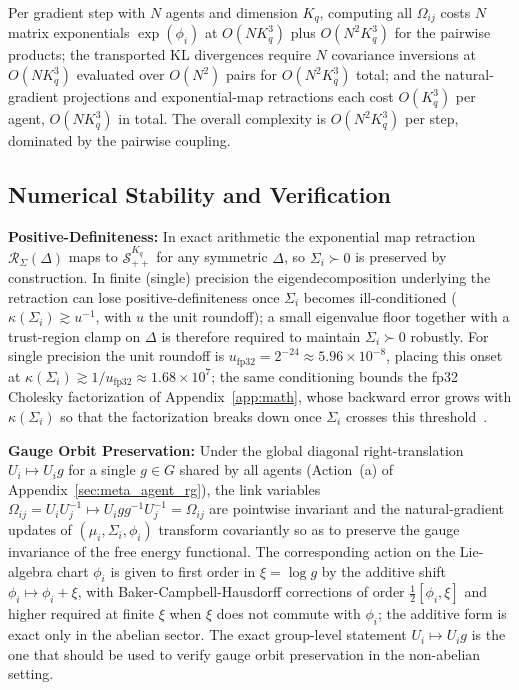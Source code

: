 \documentclass[11pt]{article}
\begin{document}
Per gradient step with $N$ agents and dimension $K_q$, computing all $\Omega_{ij}$ costs $N$ matrix exponentials $\exp(\phi_i)$ at $O(N K_q^3)$ plus $O(N^2 K_q^3)$ for the pairwise products; the transported KL divergences require $N$ covariance inversions at $O(N K_q^3)$ evaluated over $O(N^2)$ pairs for $O(N^2 K_q^3)$ total; and the natural-gradient projections and exponential-map retractions each cost $O(K_q^3)$ per agent, $O(N K_q^3)$ in total. The overall complexity is $O(N^2 K_q^3)$ per step, dominated by the pairwise coupling.

\subsection*{Numerical Stability and Verification}

\textbf{Positive-Definiteness:} In exact arithmetic the exponential map retraction $\mathcal{R}_{\Sigma}(\Delta)$ maps to $\mathcal{S}_{++}^{K_q}$ for any symmetric $\Delta$, so $\Sigma_i \succ 0$ is preserved by construction. In finite (single) precision the eigendecomposition underlying the retraction can lose positive-definiteness once $\Sigma_i$ becomes ill-conditioned ($\kappa(\Sigma_i) \gtrsim u^{-1}$, with $u$ the unit roundoff); a small eigenvalue floor together with a trust-region clamp on $\Delta$ is therefore required to maintain $\Sigma_i \succ 0$ robustly. For single precision the unit roundoff is $u_{\mathrm{fp32}} = 2^{-24} \approx 5.96 \times 10^{-8}$, placing this onset at $\kappa(\Sigma_i) \gtrsim 1/u_{\mathrm{fp32}} \approx 1.68 \times 10^{7}$; the same conditioning bounds the fp32 Cholesky factorization of Appendix~\ref{app:math}, whose backward error grows with $\kappa(\Sigma_i)$ so that the factorization breaks down once $\Sigma_i$ crosses this threshold~\cite[Ch.~10]{Higham2002}.

\textbf{Gauge Orbit Preservation:} Under the global diagonal right-translation $U_i \mapsto U_i g$ for a single $g \in G$ shared by all agents (Action~(a) of Appendix~\ref{sec:meta_agent_rg}), the link variables $\Omega_{ij} = U_iU_j^{-1} \mapsto U_i g g^{-1} U_j^{-1} = \Omega_{ij}$ are pointwise invariant and the natural-gradient updates of $(\mu_i, \Sigma_i, \phi_i)$ transform covariantly so as to preserve the gauge invariance of the free energy functional. The corresponding action on the Lie-algebra chart $\phi_i$ is given to first order in $\xi = \log g$ by the additive shift $\phi_i \mapsto \phi_i + \xi$, with Baker-Campbell-Hausdorff corrections of order $\tfrac{1}{2}[\phi_i, \xi]$ and higher required at finite $\xi$ when $\xi$ does not commute with $\phi_i$; the additive form is exact only in the abelian sector. The exact group-level statement $U_i \mapsto U_i g$ is the one that should be used to verify gauge orbit preservation in the non-abelian setting.
\end{document}
